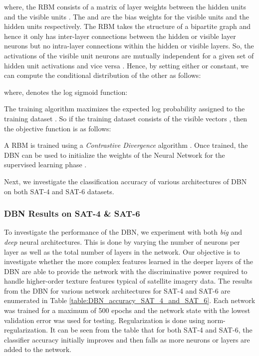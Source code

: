 \documentclass[11pt,a4paper]{article}
\begin{document}
where, the RBM consists of a matrix of layer weights  between the hidden units  and the visible units . The  and  are the bias weights for the visible units and the hidden units respectively.
The RBM takes the structure of a bipartite graph and hence it only has inter-layer connections between the hidden or visible layer neurons but no intra-layer connections within the hidden or visible layers. So, the activations of the visible unit neurons are mutually independent for a given set of hidden unit activations and vice versa \cite{carreiraperpinan2005contrastive}.  Hence, by setting either  or  constant, we can compute the conditional distribution of the other as follows:





where,  denotes the log sigmoid function:



The training algorithm maximizes the expected log probability assigned to the training dataset . So if the training dataset  consists of the visible vectors , then the objective function is as follows:



A RBM is trained using a \emph{Contrastive Divergence} algorithm \cite{carreiraperpinan2005contrastive}. Once trained, the DBN can be used to initialize the weights of the Neural Network for the supervised learning phase \cite{Bengio2009}. 

Next, we investigate the classification accuracy of various architectures of DBN on both SAT-4 and SAT-6 datasets. 


\subsubsection{DBN Results on SAT-4 \& SAT-6}
To investigate the performance of the DBN, we experiment with both \emph{big} and \emph{deep} neural architectures. This is done by varying the number of neurons per layer as well as the total number of layers in the network. Our objective is to investigate whether the more complex features learned in the deeper layers of the DBN are able to provide the network with the discriminative power required to handle higher-order texture features typical of satellite imagery data. The results from the DBN for various network architectures for SAT-4 and SAT-6 are enumerated in Table \ref{table:DBN_accuracy_SAT_4_and_SAT_6}. Each network was trained for a maximum of 500 epochs and the network state with the lowest validation error was used for testing. Regularization is done using  norm-regularization. It can be seen from the table that for both SAT-4 and SAT-6, the classifier accuracy initially improves and then falls as more neurons or layers are added to the network.
\end{document}
